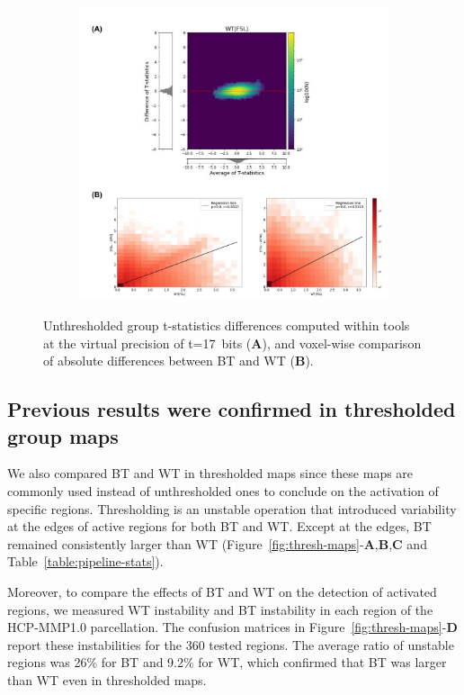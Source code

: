 \documentclass[11pt,onecolumn]{article}
\begin{document}
\begin{figure}[ht]
  \begin{subfigure}[ht]{\textwidth}
    \centering
    \includegraphics[width=.55\textwidth]{figures/p17-diffs.pdf}
  \end{subfigure}
  \caption{Unthresholded group t-statistics differences computed
  within tools at the virtual precision of t=17~bits (\textbf{A}),
  and voxel-wise comparison of absolute differences between BT and WT (\textbf{B}).}
  \label{fig:gnp-mni}
\end{figure}


\subsection{Previous results were confirmed in thresholded group maps}

We also compared BT and WT in thresholded maps since these maps are commonly used instead of unthresholded ones 
to conclude on the activation of specific regions. Thresholding is an unstable operation
that introduced variability at the edges of
active regions for both BT and WT. Except at the edges, BT remained consistently larger
than WT (Figure~\ref{fig:thresh-maps}-\textbf{A},\textbf{B},\textbf{C} and Table~\ref{table:pipeline-stats}). 

Moreover, to compare the effects of BT and WT on the detection of activated
regions, we measured WT instability and BT instability in each region of
the HCP-MMP1.0 parcellation. The confusion matrices in
Figure~\ref{fig:thresh-maps}-\textbf{D} report these instabilities for the
360 tested regions. The average ratio of unstable regions was 26\% for BT
and 9.2\% for WT, which confirmed that BT was larger than
WT even in thresholded maps.
\end{document}
